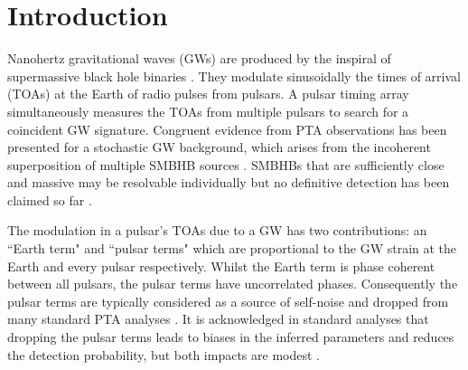 \documentclass[fleqn,usenatbib,useAMS]{mnras}
\begin{document}
\section{Introduction}\label{sec:intro}
Nanohertz gravitational waves (GWs) are produced by the inspiral of supermassive black hole binaries \citep[SMBHBs;][]{Rajagopal1995,Jaffe_2003, Wyithe2003,Sesana2013,McWilliams_2014,Ravi2015MNRAS.447.2772R,Burke2019, Skyes2022}. They modulate sinusoidally the times of arrival (TOAs) at the Earth of radio pulses from pulsars. A pulsar timing array \citep[PTA;][]{ Tiburzi2018, 2021hgwa.bookE...4V} simultaneously measures the TOAs from multiple pulsars to search for a coincident GW signature. Congruent evidence from PTA observations has been presented \citep{2023ApJ...951L...8A,2023arXiv230616214A,2023ApJ...951L...6R,2023RAA....23g5024X} for a stochastic GW background, which arises from the incoherent superposition of multiple SMBHB sources \citep{Allen1997,Sesana10,Christensen2019,Renzini2022}. SMBHBs that are sufficiently close and massive may be resolvable individually but no definitive detection has been claimed so far \citep{Jenet2004,Zhu2014PPTA,Babak2016,Arzoumanian2023,2023arXiv230616226A}. \newline 

The modulation in a pulsar's TOAs due to a GW has two contributions: an ``Earth term" and ``pulsar terms" which are proportional to the GW strain at the Earth and every pulsar respectively. Whilst the Earth term is phase coherent between all pulsars, the pulsar terms have uncorrelated phases. Consequently the pulsar terms are typically considered as a source of self-noise and dropped from many standard PTA analyses \citep[e.g.][]{Sesana2010,Babak2012,Petiteau2013,Zhu2015,Taylors2016,Goldstein2018,Charisi2023arXiv230403786C}. It is acknowledged in standard analyses that dropping the pulsar terms leads to biases in the inferred parameters and reduces the detection probability, but both impacts are modest \citep{Zhupulsarterms,Chen2022,KimpsonPTA}. \newline 
\end{document}
